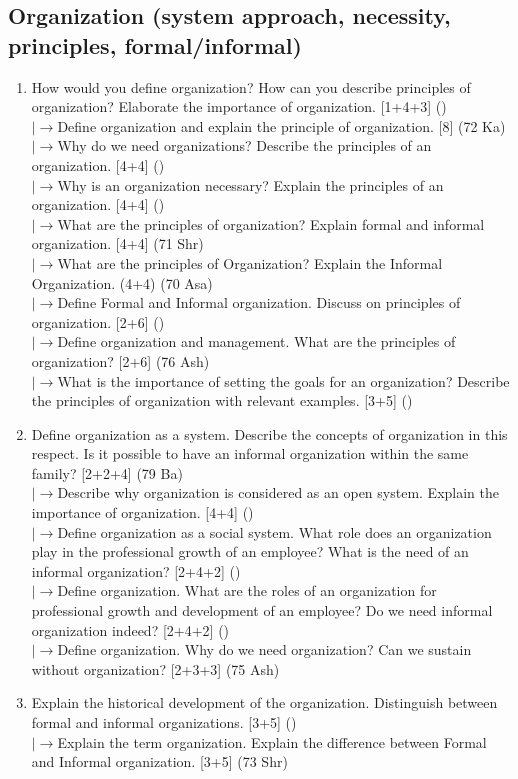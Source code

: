 \documentclass[12pt]{article}
\newcommand{\lb}{\\$\left|\rightarrow\right.$}
\begin{document}
  \subsection{Organization (system approach, necessity, principles, formal/informal)}
    \begin{enumerate}[topsep=0pt, noitemsep]
      \item How would you define organization? How can you describe principles of organization? Elaborate the importance of organization. \hfill [1+4+3] ()
        \lb Define organization and explain the principle of organization. \hfill [8] (72 Ka)
        \lb Why do we need organizations? Describe the principles of an organization. \hfill [4+4] ()
        \lb Why is an organization necessary? Explain the principles of an organization. \hfill [4+4] ()
        \lb What are the principles of organization? Explain formal and informal organization. \hfill [4+4] (71 Shr)
        \lb What are the principles of Organization? Explain the Informal Organization. \hfill (4+4) (70 Asa)
        \lb Define Formal and Informal organization. Discuss on principles of organization. \hfill [2+6] ()
        \lb Define organization and management. What are the principles of organization? \hfill [2+6] (76 Ash)
        \lb What is the importance of setting the goals for an organization? Describe the principles of organization with relevant examples. \hfill [3+5] ()

      \item Define organization as a system. Describe the concepts of organization in this respect. Is it possible to have an informal organization within the same family? \hfill [2+2+4] (79 Ba)
        \lb Describe why organization is considered as an open system. Explain the importance of organization. \hfill [4+4] ()
        \lb Define organization as a social system. What role does an organization play in the professional growth of an employee? What is the need of an informal organization? \hfill [2+4+2] ()
        \lb Define organization. What are the roles of an organization for professional growth and development of an employee? Do we need informal organization indeed? \hfill [2+4+2] ()
        \lb Define organization. Why do we need organization? Can we sustain without organization? \hfill [2+3+3] (75 Ash)

      \item Explain the historical development of the organization. Distinguish between formal and informal organizations. \hfill [3+5] ()
        \lb Explain the term organization. Explain the difference between Formal and Informal organization. \hfill [3+5] (73 Shr)


\end{enumerate}
\end{document}
